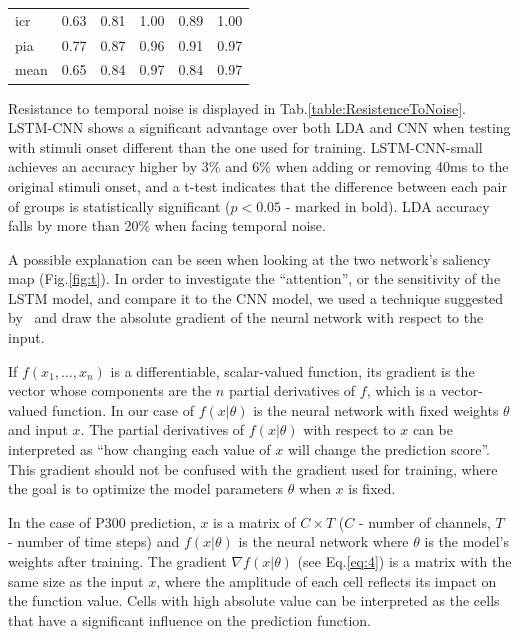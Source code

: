 \documentclass[
12pt, %
english, %
doublespacing, %
headsepline, %
]{MastersDoctoralThesis} %
\begin{document}
\begin{table}[t]
\begin{tabular}{l|ccccc}
		icr     &                  0.63 &                  0.81 &                            1.00 &                             0.89 &                                               1.00 \\
		pia     &                  0.77 &                  0.87 &                            0.96 &                             0.91 &                                               0.97 \\
		mean    &                  0.65 &                  0.84 &                            0.97 &                             0.84 &                                               0.97 \\
		\bottomrule
	\end{tabular}
\end{table}

\vspace{5mm}

Resistance to temporal noise is displayed in Tab.\ref{table:ResistenceToNoise}. LSTM-CNN shows a significant advantage over both LDA and CNN when testing with stimuli onset different than the one used for training. LSTM-CNN-small achieves an accuracy higher by 3\% and 6\% when adding or removing 40ms to the original stimuli onset, and a t-test indicates that the difference between each pair of groups is statistically significant ($p < 0.05$ - marked in bold). LDA accuracy falls by more than 20\% when facing temporal noise.

A possible explanation can be seen when looking at the two network's saliency map (Fig.\ref{fig:t}). In order to investigate the ``attention'', or the sensitivity of the LSTM model, and compare it to the CNN model, we used a technique suggested by~\cite{graves2012supervised} and draw the absolute gradient of the neural network with respect to the input.

If $f(x_{1}, ..., x_{n})$ is a differentiable, scalar-valued function, its gradient is the vector whose components are the $n$ partial derivatives of $f$, which is a vector-valued function. In our case of $f(x|\theta)$ is the neural network with fixed weights $\theta$ and input $x$. The partial derivatives of $f(x|\theta)$ with respect to $x$ can be interpreted as ``how changing each value of $x$ will change the prediction score''. This gradient should not be confused with the gradient used for training, where the goal is to optimize the model parameters $\theta$ when $x$ is fixed.


	In the case of P300 prediction, $x$ is a matrix of $C\times{T}$ ($C$ - number of channels, $T$ - number of time steps) and $f(x|\theta)$ is the neural network where $\theta$ is the model's weights after training. The gradient $\nabla{f(x|\theta)}$ (see Eq.\ref{eq:4}) is a matrix with the same size as the input $x$, where the amplitude of each cell reflects its impact on the function value. Cells with high absolute value can be interpreted as the cells that have a significant influence on the prediction function.
	
\end{document}
